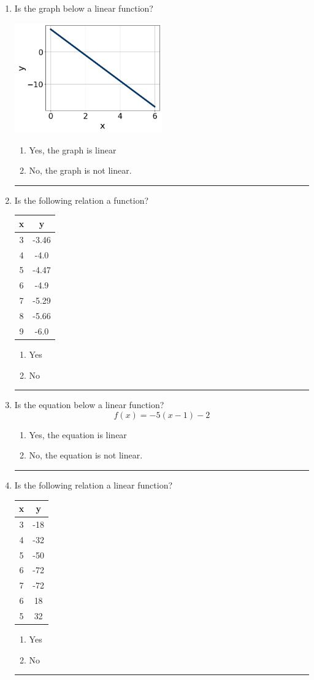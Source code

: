 \documentclass[14pt]{extbook}
\newcommand{\litem}[1]{\item#1\hspace*{-1cm}\rule{\textwidth}{0.4pt}}
\begin{document}
\begin{enumerate}
\litem{
Is the graph below a linear function?
\begin{center}
    \includegraphics[width=0.5\textwidth]{../Figures/MA_8_F_1_2_graphP.png}
\end{center}
\begin{enumerate}[label=\Alph*.]
\item Yes, the graph is linear
\item No, the graph is not linear.

\end{enumerate} }
\litem{
Is the following relation a function?

\begin{tabular}{c|c}
x &y\tabularnewline \hline
3 &-3.46\tabularnewline \hline
4 &-4.0\tabularnewline \hline
5 &-4.47\tabularnewline \hline
6 &-4.9\tabularnewline \hline
7 &-5.29\tabularnewline \hline
8 &-5.66\tabularnewline \hline
9 &-6.0\end{tabular}\begin{enumerate}[label=\Alph*.]
\item Yes
\item No

\end{enumerate} }
\litem{
Is the equation below a linear function?\[ f(x) = -5(x -1)-2 \]\begin{enumerate}[label=\Alph*.]
\item Yes, the equation is linear
\item No, the equation is not linear.

\end{enumerate} }
\litem{
Is the following relation a linear function?

\begin{tabular}{c|c}
x &y\tabularnewline \hline
3 &-18\tabularnewline \hline
4 &-32\tabularnewline \hline
5 &-50\tabularnewline \hline
6 &-72\tabularnewline \hline
7 &-72\tabularnewline \hline
6 &18\tabularnewline \hline
5 &32\end{tabular}\begin{enumerate}[label=\Alph*.]
\item Yes
\item No

\end{enumerate} }
\end{enumerate}
\end{document}
